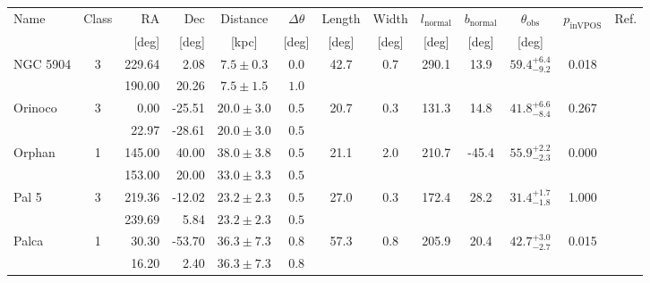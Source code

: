 \begin{tabular}{lcrrccccccccr}
	\toprule
	Name & Class & RA & Dec & Distance & $\Delta \theta$ & Length & Width & $l_\text{normal}$ & $b_\text{normal}$ & $\theta_\text{obs}$ & $p_\text{inVPOS}$ & Ref. \\
	 &  & [deg] & [deg] & [kpc] & [deg] & [deg] & [deg] & [deg] & [deg] & [deg] &  &  \\
	\midrule
	\multirow{2}{*}{NGC 5904} & \multirow{2}{*}{3} & 229.64 & 2.08 & $7.5 \pm 0.3$ & $0.0$ & \multirow{2}{*}{42.7} & \multirow{2}{*}{0.7} & \multirow{2}{*}{290.1} & \multirow{2}{*}{13.9} & \multirow{2}{*}{$59.4^{+6.4}_{-9.2}$} & \multirow{2}{*}{0.018} & \multirow{2}{*}{\citet{Grillmair:2019}} \\
	 &  & 190.00 & 20.26 & $7.5 \pm 1.5$ & $1.0$ &  &  &  &  &  &  &  \\
	\multirow{2}{*}{Orinoco} & \multirow{2}{*}{3} & 0.00 & -25.51 & $20.0 \pm 3.0$ & $0.5$ & \multirow{2}{*}{20.7} & \multirow{2}{*}{0.3} & \multirow{2}{*}{131.3} & \multirow{2}{*}{14.8} & \multirow{2}{*}{$41.8^{+6.6}_{-8.4}$} & \multirow{2}{*}{0.267} & \multirow{2}{*}{\citet{Grillmair:2017b}} \\
	 &  & 22.97 & -28.61 & $20.0 \pm 3.0$ & $0.5$ &  &  &  &  &  &  &  \\
	\multirow{2}{*}{Orphan} & \multirow{2}{*}{1} & 145.00 & 40.00 & $38.0 \pm 3.8$ & $0.5$ & \multirow{2}{*}{21.1} & \multirow{2}{*}{2.0} & \multirow{2}{*}{210.7} & \multirow{2}{*}{-45.4} & \multirow{2}{*}{$55.9^{+2.2}_{-2.3}$} & \multirow{2}{*}{0.000} & \multirow{2}{*}{\citet{Malhan:2018}} \\
	 &  & 153.00 & 20.00 & $33.0 \pm 3.3$ & $0.5$ &  &  &  &  &  &  &  \\
	\multirow{2}{*}{Pal 5} & \multirow{2}{*}{3} & 219.36 & -12.02 & $23.2 \pm 2.3$ & $0.5$ & \multirow{2}{*}{27.0} & \multirow{2}{*}{0.3} & \multirow{2}{*}{172.4} & \multirow{2}{*}{28.2} & \multirow{2}{*}{$31.4^{+1.7}_{-1.8}$} & \multirow{2}{*}{1.000} & \multirow{2}{*}{\citet{Starkman:2019}} \\
	 &  & 239.69 & 5.84 & $23.2 \pm 2.3$ & $0.5$ &  &  &  &  &  &  &  \\
	\multirow{2}{*}{Palca} & \multirow{2}{*}{1} & 30.30 & -53.70 & $36.3 \pm 7.3$ & $0.8$ & \multirow{2}{*}{57.3} & \multirow{2}{*}{0.8} & \multirow{2}{*}{205.9} & \multirow{2}{*}{20.4} & \multirow{2}{*}{$42.7^{+3.0}_{-2.7}$} & \multirow{2}{*}{0.015} & \multirow{2}{*}{\citet{Shipp:2018}} \\
	 &  & 16.20 & 2.40 & $36.3 \pm 7.3$ & $0.8$ &  &  &  &  &  &  &  \\

\end{tabular}
